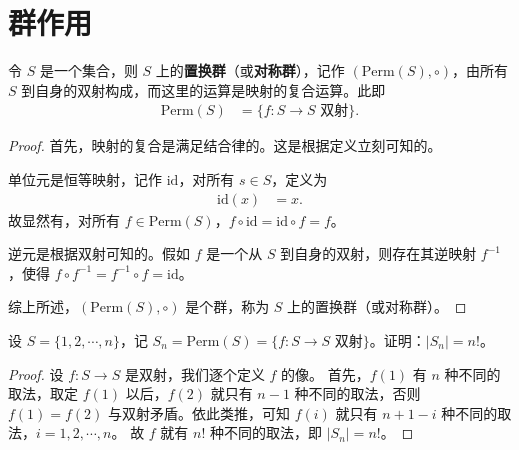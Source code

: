 \documentclass[../../main.tex]{subfiles}
\begin{document}
\section{群作用}

\begin{definition}
令 \(S\) 是一个集合，则 \(S\) 上的\textbf{置换群}（或\textbf{对称群}），记作 \((\mathrm{Perm}(S), \circ)\)，由所有 \(S\) 到自身的双射构成，而这里的运算是映射的复合运算。此即
\begin{align*}
\mathrm{Perm}(S) &= \{f : S \to S \text{ 双射}\} .
\end{align*}
\end{definition}
\begin{proof}
首先，映射的复合是满足结合律的。这是根据定义立刻可知的。

单位元是恒等映射，记作 \(\mathrm{id}\)，对所有 \(s \in S\)，定义为
\begin{align*}
\mathrm{id}(x) &= x .
\end{align*}
故显然有，对所有 \(f \in \mathrm{Perm}(S)\)，\(f \circ \mathrm{id} = \mathrm{id} \circ f = f\)。

逆元是根据双射可知的。假如 \(f\) 是一个从 \(S\) 到自身的双射，则存在其逆映射 \(f^{-1}\)，使得 \(f \circ f^{-1} = f^{-1} \circ f = \mathrm{id}\)。

综上所述，\((\mathrm{Perm}(S), \circ)\) 是个群，称为 \(S\) 上的置换群（或对称群）。 
\end{proof}

\begin{example}
设 \(S = \{1, 2, \cdots, n\}\)，记 \(S_n = \mathrm{Perm}(S) = \{f : S \to S \text{ 双射}\}\)。证明：\(\vert S_n \vert = n!\)。
\end{example}
\begin{proof}
设 \(f : S \to S\) 是双射，我们逐个定义 \(f\) 的像。
首先，\(f(1)\) 有 \(n\) 种不同的取法，取定 \(f(1)\) 以后，\(f(2)\) 就只有 \(n - 1\) 种不同的取法，否则 \(f(1) = f(2)\) 与双射矛盾。依此类推，可知 \(f(i)\) 就只有 \(n + 1 - i\) 种不同的取法，\(i = 1, 2, \cdots, n\)。
故 \(f\) 就有 \(n!\) 种不同的取法，即 \(\vert S_n \vert = n!\)。 
\end{proof}
\end{document}
